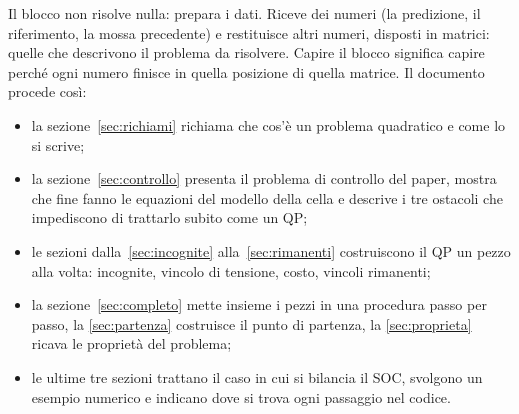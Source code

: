 \documentclass[11pt,a4paper]{article}
\newcommand{\file}[1]{\texttt{\detokenize{#1}}}
\begin{document}
\noindent
Il blocco \file{Problema_QP} non risolve nulla: prepara i dati. Riceve dei
numeri (la predizione, il riferimento, la mossa precedente) e restituisce
altri numeri, disposti in matrici: quelle che descrivono il problema da
risolvere. Capire il blocco significa capire perché ogni numero finisce in
quella posizione di quella matrice. Il documento procede così:
\begin{itemize}
  \item la sezione~\ref{sec:richiami} richiama che cos'è un problema
        quadratico e come lo si scrive;
  \item la sezione~\ref{sec:controllo} presenta il problema di controllo del
        paper, mostra che fine fanno le equazioni del modello della cella e
        descrive i tre ostacoli che impediscono di trattarlo subito come un QP;
  \item le sezioni dalla~\ref{sec:incognite} alla~\ref{sec:rimanenti}
        costruiscono il QP un pezzo alla volta: incognite, vincolo di tensione,
        costo, vincoli rimanenti;
  \item la sezione~\ref{sec:completo} mette insieme i pezzi in una procedura
        passo per passo, la \ref{sec:partenza} costruisce il punto di
        partenza, la \ref{sec:proprieta} ricava le proprietà del problema;
  \item le ultime tre sezioni trattano il caso in cui si bilancia il SOC,
        svolgono un esempio numerico e indicano dove si trova ogni passaggio
        nel codice.
\end{itemize}
\end{document}
